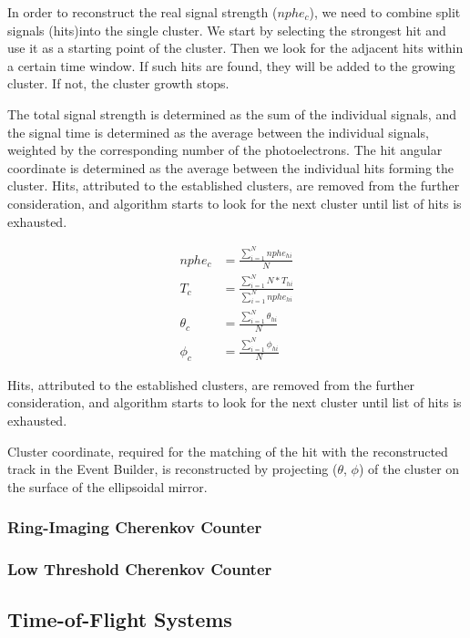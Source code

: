 \documentclass{elsart}
\begin{document}
In order to reconstruct the real signal strength ($nphe_c$), we need to combine split signals (hits)into the single
cluster. We start by selecting the strongest hit and use it as a starting point of the cluster. Then we look for the
adjacent hits within a certain time window.  If such hits are found, they will be added to the growing cluster. If
not, the cluster growth stops.

The total signal strength is determined as the sum of the individual signals, and the signal time is determined as
the average between the individual signals, weighted by the corresponding number of the photoelectrons. The hit
angular coordinate is determined as the average between the individual hits forming the cluster.  Hits, attributed
to the established clusters, are removed from the further consideration, and algorithm starts to look for the next
cluster until list of hits is exhausted.

\begin{eqnarray*}
nphe_c &= \frac{\sum_{i=1}^{N}{nphe_{hi}}}{N}\\
T_c &= \frac{\sum_{i=1}^{N}{N*T_{hi}}}{\sum_{i=1}^{N}{nphe_{hi}}}\\	
\theta_c &=\frac{\sum_{i=1}^{N}{\theta_{hi}}}{N}\\
\phi_c &= \frac{\sum_{i=1}^{N}{\phi_{hi}}}{N}
\end{eqnarray*}

Hits, attributed to the established clusters, are removed from the further consideration, and algorithm starts to
look for the next cluster until list of hits is exhausted. 
	 
Cluster coordinate, required for the matching of the hit with the reconstructed track in the Event Builder, is
reconstructed by projecting  ($\theta$, $\phi$) of the cluster on the surface of the ellipsoidal mirror.		

\subsubsection{Ring-Imaging Cherenkov Counter}

\subsubsection{Low Threshold Cherenkov Counter}

\subsection{Time-of-Flight Systems}
\end{document}
